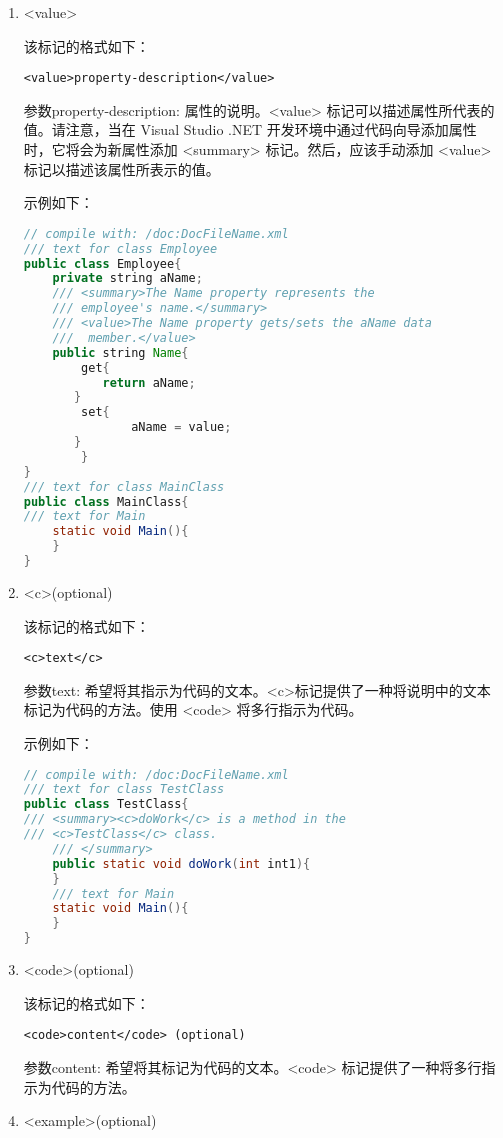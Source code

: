 \begin{enumerate}
\item <value>

该标记的格式如下： 
\begin{lstlisting}
<value>property-description</value>
\end{lstlisting}
参数property-description: 属性的说明。<value> 标记可以描述属性所代表的值。请注意，当在 Visual Studio .NET 开发环境中通过代码向导添加属性时，它将会为新属性添加 <summary> 标记。然后，应该手动添加 <value> 标记以描述该属性所表示的值。

示例如下：
\begin{lstlisting}[language=java]
// compile with: /doc:DocFileName.xml 
/// text for class Employee
public class Employee{
    private string aName;
    /// <summary>The Name property represents the 
    /// employee's name.</summary>
    /// <value>The Name property gets/sets the aName data 
    ///  member.</value>
    public string Name{
        get{ 
	       return aName; 
	   }
        set{ 
               aName = value; 
	   }
    	}
}
/// text for class MainClass
public class MainClass{
/// text for Main
    static void Main(){ 
    }
}
\end{lstlisting}

\item <c>(optional)

该标记的格式如下：
\begin{lstlisting}
<c>text</c>
\end{lstlisting}
参数text: 希望将其指示为代码的文本。<c>标记提供了一种将说明中的文本标记为代码的方法。使用 <code> 将多行指示为代码。

示例如下：
\begin{lstlisting}[language=java]
// compile with: /doc:DocFileName.xml 
/// text for class TestClass
public class TestClass{
/// <summary><c>doWork</c> is a method in the 
/// <c>TestClass</c> class.
    /// </summary>
    public static void doWork(int int1){ 
    }
    /// text for Main
    static void Main(){ 
    }
}
\end{lstlisting}

\item <code>(optional)

该标记的格式如下：
\begin{lstlisting}
<code>content</code> (optional)
\end{lstlisting}
参数content: 希望将其标记为代码的文本。<code> 标记提供了一种将多行指示为代码的方法。

\item <example>(optional)


\end{enumerate}
